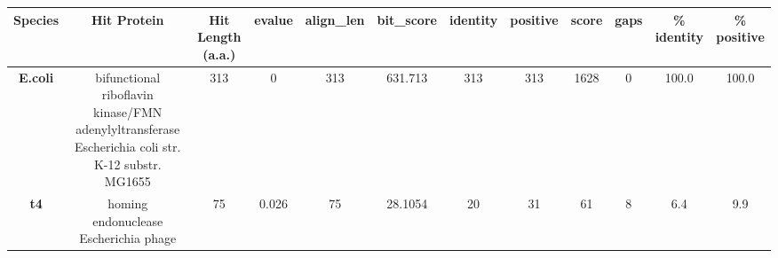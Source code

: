 \begin{tabular}{|c|c|c|c|c|c|c|c|c|c|c|c|} \hline
\textbf{Species} & \textbf{Hit Protein} & \textbf{Hit Length (a.a.)} & \textbf{evalue} & \textbf{align\_len} & \textbf{bit\_score} & \textbf{identity} & \textbf{positive} & \textbf{score} & \textbf{gaps} & \textbf{\% identity} & \textbf{\% positive} \\ \hline
\textbf{E.coli} & bifunctional riboflavin kinase/FMN adenylyltransferase Escherichia coli str. K-12 substr. MG1655 & 313 & 0 & 313 & 631.713 & 313 & 313 & 1628 & 0 & 100.0 & 100.0\\
\textbf{t4} & homing endonuclease Escherichia phage  & 75 & 0.026 & 75 & 28.1054 & 20 & 31 & 61 & 8 & 6.4 & 9.9\\
\hline \end{tabular}

